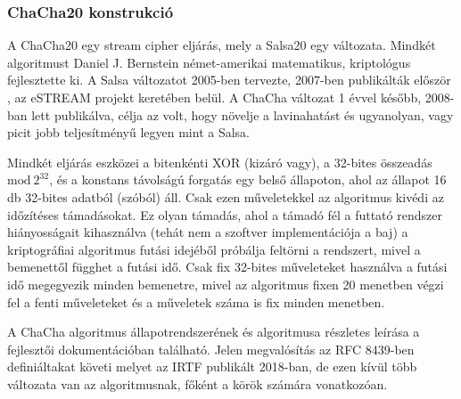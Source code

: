 \documentclass[hidelinks, 12pt]{article}
\begin{document}
	\subsubsection{ChaCha20 konstrukció}
	A ChaCha20 egy stream cipher eljárás, mely a Salsa20 egy változata. Mindkét algoritmust Daniel J. Bernstein német-amerikai matematikus, kriptológus fejlesztette ki. A Salsa változatot 2005-ben tervezte, 2007-ben publikálták először \cite{salsa}, az eSTREAM projekt keretében belül. A ChaCha változat 1 évvel később, 2008-ban lett publikálva, célja az volt, hogy növelje a lavinahatást és ugyanolyan, vagy picit jobb teljesítményű legyen mint a Salsa. \cite{chacha}
	
	Mindkét eljárás eszközei a bitenkénti XOR (kizáró vagy), a 32-bites összeadás $\textrm{mod}\ 2^{32}$, és a konstans távolságú forgatás egy belső állapoton, ahol az állapot 16 db 32-bites adatból (szóból) áll. Csak ezen műveletekkel az algoritmus kivédi az időzítéses támadásokat. Ez olyan támadás, ahol a támadó fél a futtató rendszer hiányosságait kihasználva (tehát nem a szoftver implementációja a baj) a kriptográfiai algoritmus futási idejéből próbálja feltörni a rendszert, mivel a bemenettől függhet a futási idő. Csak fix 32-bites műveleteket használva a futási idő megegyezik minden bemenetre, mivel az algoritmus fixen 20 menetben végzi fel a fenti műveleteket és a műveletek száma is fix minden menetben.
	
	A ChaCha algoritmus állapotrendszerének és algoritmusa részletes leírása a fejlesztői dokumentációban található. Jelen megvalósítás az RFC 8439-ben \cite{RFC} definiáltakat követi melyet az IRTF publikált 2018-ban, de ezen kívül több változata van az algoritmusnak, főként a körök számára vonatkozóan.
	
\end{document}
